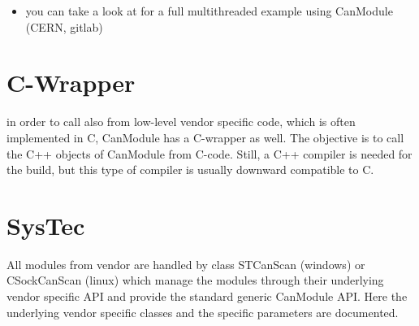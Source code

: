 \documentclass[letterpaper,10pt,english]{sphinxmanual}
\begin{document}
\begin{sphinxVerbatim}[commandchars=\\\{\}]
 
  
          
\end{sphinxVerbatim}

\begin{sphinxVerbatim}[commandchars=\\\{\}]
 
    
        
     
\end{sphinxVerbatim}
\begin{itemize}
\item {} 
you can take a look at  for a full multithreaded example using CanModule (CERN, gitlab)

\end{itemize}


\chapter{C-Wrapper}
\label{\detokenize{cwrapper:c-wrapper}}\label{\detokenize{cwrapper::doc}}
in order to call  also from low-level vendor specific code, which is often implemented
in C, CanModule has a C-wrapper as well. The objective is to call the C++ objects of CanModule
from C-code. Still, a C++ compiler is needed for the build, but this type of
compiler is usually downward compatible to C.


\chapter{SysTec}
\label{\detokenize{vendors/systec:systec}}\label{\detokenize{vendors/systec::doc}}
All modules from vendor {\hyperref[\detokenize{vendors/systec:systec}]{}} are handled by class STCanScan (windows) or CSockCanScan (linux) which
manage the modules through their underlying vendor specific API and provide the standard generic CanModule API.
Here the underlying vendor specific classes and the specific parameters are documented.
\end{document}
